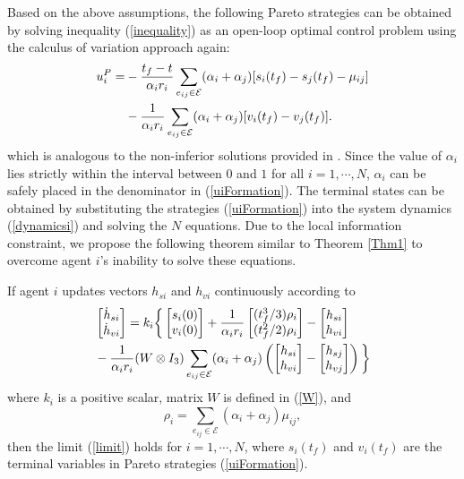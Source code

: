 \documentclass[letterpaper, 10 pt, conference,onecolumn]{ieeeconf}  %
\begin{document}
Based on the above assumptions, the following Pareto strategies can be obtained {by solving inequality (\ref{inequality}) as an open-loop optimal control problem using the calculus of variation approach again:}
\begin{align}
u^P_i=& -\frac{t_f-t}{\alpha_ir_i}\sum_{e_{ij}\in\mathcal{E}} (\alpha_i+\alpha_j)[s_{i}(t_f)-s_{j}(t_f)-\mu_{ij}] \notag\\&-\frac{1}{\alpha_ir_i}\sum_{e_{ij}\in\mathcal{E}} (\alpha_i+\alpha_j)[v_{i}(t_f)-v_{j}(t_f)].
\label{uiFormation}
\end{align}
{{which is analogous to the {non-inferior} solutions provided in \cite{Starr}}}. {Since the value of $\alpha_i$ lies strictly within the interval between $0$ and $1$ for all $i=1,\cdots,N$, $\alpha_i$ can be safely placed in the denominator in (\ref{uiFormation})}. The terminal states can be obtained by substituting the strategies (\ref{uiFormation}) into the system dynamics (\ref{dynamicsi}) and solving the $N$ equations. Due to the local information constraint, we propose the following theorem similar to Theorem \ref{Thm1} to overcome agent $i$'s inability to solve these equations.
\begin{thm}
If agent $i$ updates vectors $h_{si}$ and $h_{vi}$ continuously according to
{\begin{align}
&\begin{bmatrix}
\dot{h}_{si}\\
\dot{h}_{vi}
\end{bmatrix}=k_i\bigg\{\begin{bmatrix}
s_{i}(0)\\
v_{i}(0)
\end{bmatrix}+\frac{1}{\alpha_ir_i}\begin{bmatrix}
(t_f^3/3)\rho_i\\
(t_f^2/2)\rho_i
\end{bmatrix}-\begin{bmatrix}
h_{si}\\
h_{vi}
\end{bmatrix}\notag\\
&-\frac{1}{\alpha_ir_i}(W\otimes I_3)\sum_{e_{ij}\in\mathcal{E}} (\alpha_i+\alpha_j)\left(\begin{bmatrix}
h_{si}\\
h_{vi}
\end{bmatrix}-\begin{bmatrix}
h_{sj}\\
h_{vj}
\end{bmatrix}\right)\bigg\}\label{updatehphv}
\end{align}}
where $k_i$ is a positive scalar, matrix $W$ is defined in (\ref{W}), and
\[\rho_i=\sum_{e_{ij}\in\mathcal{E}}( \alpha_i+\alpha_j )\mu_{ij},\]
then the limit (\ref{limit}) holds for $i=1,\cdots,N$, where $s_i(t_f)$ and $v_i(t_f)$ are the terminal variables {in} Pareto strategies (\ref{uiFormation}).
\end{thm}
\end{document}
